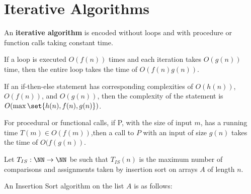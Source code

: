 \documentclass[11pt]{scrartcl}
\begin{document}
\section{Iterative Algorithms}

An \textbf{iterative algorithm} is encoded without loops and with
procedure or function calls taking constant time.

If a loop is executed $O(f(n))$ times and each iteration takes
$O(g(n))$ time, then the entire loop takes the time of $O(f(n)g(n))$.

If an if-then-else statement has corresponding complexities of
$O(h(n))$, $O(f(n))$, and $O(g(n))$, then the complexity of the
statement is $O(\max\set{h(n), f(n), g(n)})$.

For procedural or functional calls, if P, with the size of input $m$,
has a running time $T(m)\in O(f(m))$,then a call to $P$ with an input
of size $g(n)$ takes the time of $O(f(g(n))$.

Let $T_{IS}:\NN \to \NN$ be such that $T_{IS}(n)$ is the maximum
number of comparisons and assignments taken by insertion sort on
arrays $A$ of length $n$.

An Insertion Sort algorithm on the list $A$ is as follows:

\begin{flagderiv}
  \done
\end{flagderiv}
\end{document}
